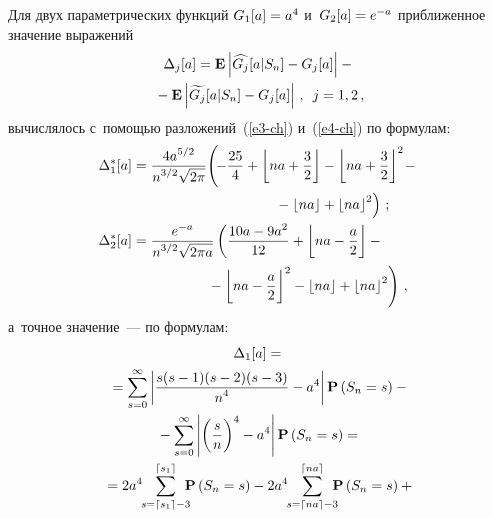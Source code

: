 \begin{multicols}{2}
 Для двух параметрических функций $G_1[a]\hm=a^4$ и~$G_2[a]\hm=e^{-a}$
 приближенное значение выражений
 \begin{multline*}
\Delta_j[a]=\mathbf{E} \left|\widehat{G_j}[a|S_n]-G_j[a]\right|-{}\\
{}-
 \mathbf{E} \left|\widetilde{G_j}[a|S_n]-G_j[a]\right|\,,\enskip j=1,2\,,
 \end{multline*}
 вычислялось с~помощью разложений~(\ref{e3-ch}) и~(\ref{e4-ch}) по формулам:
 \begin{align*}
 \Delta_1^*[a]&=\fr{4a^{5/2}}{n^{3/2} \sqrt{2\pi}}\!
 \left(\!-\fr{25}{4} +\left\lfloor na+\fr{3}{2} \right\rfloor-
 \left\lfloor na+\fr{3}{2} \right\rfloor^2\!
 -{}\right.\\
&\hspace*{35mm}\left. {}-\left\lfloor na \right\rfloor+
 \left\lfloor na \right\rfloor^2 \right)\,;
 \\
 \Delta_2^*[a]&=\fr{e^{-a}}{n^{3/2} \sqrt{2 \pi a}}
 \left( \fr{10a-9a^2}{12}+
 \left \lfloor na-\fr{a}{2} \right\rfloor -{}\right.\\
 &\left.\hspace*{18mm}{}-
 \left\lfloor na-\fr{a}{2} \right\rfloor^2-
 \left\lfloor na\right\rfloor
  +\left\lfloor na\right\rfloor^2
 \right)\,,
 \end{align*}
 а~точное значение~--- по формулам:
 \begin{multline*}
 \Delta_1[a]  ={}\\
 {}=\sum\limits_{s=0}^\infty \left|\fr{s(s-1)(s-2)(s-3)}{n^4}-a^4 \right|
 \mathbf{P}\left(S_n=s\right)-{}\\
 {} -\sum\limits_{s=0}^\infty \left|\left(\fr{s}{n}\right)^4-a^4 \right|
 \mathbf{P}\left(S_n=s\right)
 ={}\\
 {}=2a^4\hspace*{-1mm}\sum\limits_{s=\lceil s_1 \rceil-3}^{\lceil s_1 \rceil} \hspace*{-2mm}
 \mathbf{P}\left(S_n=s\right)-
 2a^4\hspace*{-1mm}\sum\limits_{s=\lceil na \rceil-3}^{\lceil na \rceil}\hspace*{-2mm}
 \mathbf{P}\left(S_n=s\right)
  +{}
 \end{multline*}
 
 \end{multicols}
